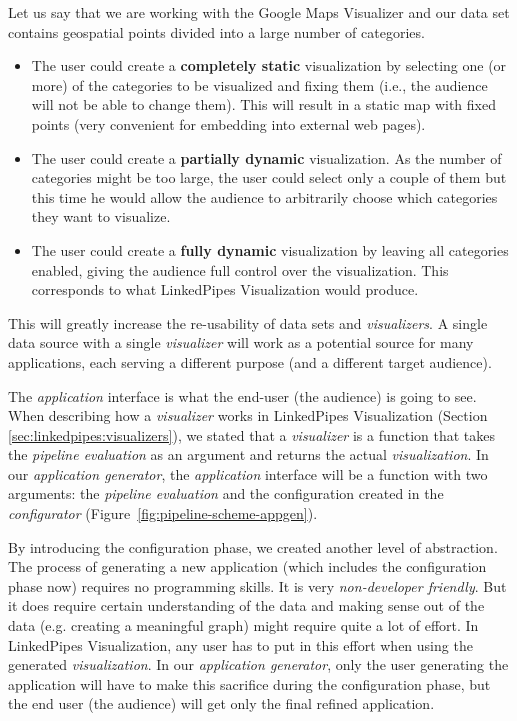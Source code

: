 Let us say that we are working with the Google Maps Visualizer and our data set contains geospatial points divided into a large number of categories. 

\begin{itemize}
\item The user could create a \textbf{completely static} visualization by selecting one (or more) of the categories to be visualized and fixing them (i.e., the audience will not be able to change them). This will result in a static map with fixed points (very convenient for embedding into external web pages).
\item The user could create a \textbf{partially dynamic} visualization. As the number of categories might be too large, the user could select only a couple of them but this time he would allow the audience to arbitrarily choose which categories they want to visualize.
\item The user could create a \textbf{fully dynamic} visualization by leaving all categories enabled, giving the audience full control over the visualization. This corresponds to what LinkedPipes Visualization would produce.
\end{itemize}

This will greatly increase the re-usability of data sets and \emph{visualizers}. A single data source with a single \emph{visualizer} will work as a potential source for many applications, each serving a different purpose (and a different target audience).

The \emph{application} interface is what the end-user (the audience) is going to see. When describing how a \emph{visualizer} works in LinkedPipes Visualization (Section \ref{sec:linkedpipes:visualizers}), we stated that a \emph{visualizer} is a function that takes the \emph{pipeline evaluation} as an argument and returns the actual \emph{visualization}. In our \emph{application generator}, the \emph{application} interface will be a function with two arguments: the \emph{pipeline evaluation} and the configuration created in the \emph{configurator} (Figure~\ref{fig:pipeline-scheme-appgen}).

By introducing the configuration phase, we created another level of abstraction. The process of generating a new application (which includes the configuration phase now) requires no programming skills. It is very \emph{non-developer friendly}. But it does require certain understanding of the data and making sense out of the data (e.g. creating a meaningful graph) might require quite a lot of effort. In LinkedPipes Visualization, any user has to put in this effort when using the generated \emph{visualization}. In our \emph{application generator}, only the user generating the application will have to make this sacrifice during the configuration phase, but the end user (the audience) will get only the final refined application.

